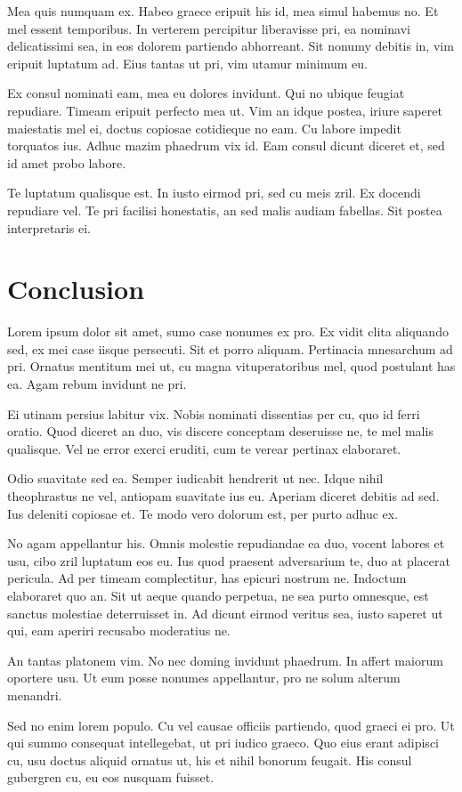 \documentclass{article}
\begin{document}
Mea quis numquam ex. Habeo graece eripuit his id, mea simul habemus no. Et mel essent temporibus. In verterem percipitur liberavisse pri, ea nominavi delicatissimi sea, in eos dolorem partiendo abhorreant. Sit nonumy debitis in, vim eripuit luptatum ad. Eius tantas ut pri, vim utamur minimum eu.

Ex consul nominati eam, mea eu dolores invidunt. Qui no ubique feugiat repudiare. Timeam eripuit perfecto mea ut. Vim an idque postea, iriure saperet maiestatis mel ei, doctus copiosae cotidieque no eam. Cu labore impedit torquatos ius. Adhuc mazim phaedrum vix id. Eam consul dicunt diceret et, sed id amet probo labore.

Te luptatum qualisque est. In iusto eirmod pri, sed cu meis zril. Ex docendi repudiare vel. Te pri facilisi honestatis, an sed malis audiam fabellas. Sit postea interpretaris ei.
\section{Conclusion}
Lorem ipsum dolor sit amet, sumo case nonumes ex pro. Ex vidit clita aliquando sed, ex mei case iisque persecuti. Sit et porro aliquam. Pertinacia mnesarchum ad pri. Ornatus mentitum mei ut, cu magna vituperatoribus mel, quod postulant has ea. Agam rebum invidunt ne pri.

Ei utinam persius labitur vix. Nobis nominati dissentias per cu, quo id ferri oratio. Quod diceret an duo, vis discere conceptam deseruisse ne, te mel malis qualisque. Vel ne error exerci eruditi, cum te verear pertinax elaboraret.

Odio suavitate sed ea. Semper iudicabit hendrerit ut nec. Idque nihil theophrastus ne vel, antiopam suavitate ius eu. Aperiam diceret debitis ad sed. Ius deleniti copiosae et. Te modo vero dolorum est, per purto adhuc ex.

No agam appellantur his. Omnis molestie repudiandae ea duo, vocent labores et usu, cibo zril luptatum eos eu. Ius quod praesent adversarium te, duo at placerat pericula. Ad per timeam complectitur, has epicuri nostrum ne. Indoctum elaboraret quo an. Sit ut aeque quando perpetua, ne sea purto omnesque, est sanctus molestiae deterruisset in. Ad dicunt eirmod veritus sea, iusto saperet ut qui, eam aperiri recusabo moderatius ne.

An tantas platonem vim. No nec doming invidunt phaedrum. In affert maiorum oportere usu. Ut eum posse nonumes appellantur, pro ne solum alterum menandri.

Sed no enim lorem populo. Cu vel causae officiis partiendo, quod graeci ei pro. Ut qui summo consequat intellegebat, ut pri iudico graeco. Quo eius erant adipisci cu, usu doctus aliquid ornatus ut, his et nihil bonorum feugait. His consul gubergren cu, eu eos nusquam fuisset.
\end{document}
